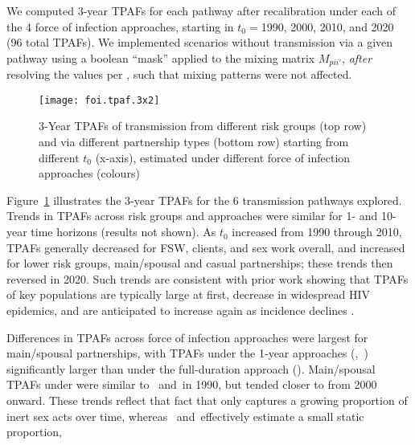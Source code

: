 We computed 3-year TPAFs for each pathway
after recalibration under each of the 4 force of infection approaches,
starting in $t_0 = {}$1990, 2000, 2010, and 2020 (96 total TPAFs).
We implemented scenarios without transmission via a given pathway
using a boolean ``mask'' applied to the mixing matrix $M_{pii'}$,
\emph{after} resolving the values per ,
such that mixing patterns were not affected.
\par
\begin{figure}
  \texttt{[image: foi.tpaf.3x2]}
  \caption{3-Year TPAFs of transmission
    from different risk groups (top row) and
    via different partnership types (bottom row)
    starting from different $t_0$ (x-axis),
    estimated under different force of infection approaches (colours)}
  \label{fig:foi.tpaf}
\end{figure}
Figure~\ref{fig:foi.tpaf} illustrates the 3-year TPAFs
for the 6 transmission pathways explored.
Trends in TPAFs across risk groups and approaches
were similar for 1- and 10-year time horizons (results not shown).
As $t_0$ increased from 1990 through 2010, TPAFs generally
decreased for FSW, clients, and sex work overall, and
increased for lower risk groups, main/spousal and casual partnerships;
these trends then reversed in 2020.
Such trends are consistent with prior work showing that
TPAFs of key populations are typically large at first,
decrease in widespread HIV epidemics, and
are anticipated to increase again as incidence declines
\cite{Johnson2011,Mishra2012sr,Boily2015,Brown2019,Garnett2021}.
\par
Differences in TPAFs across force of infection approaches were
largest for main/spousal partnerships, with TPAFs
under the 1-year approaches (\iry,~\ipy) significantly larger than
under the full-duration approach (\ird).
Main/spousal TPAFs under \epa were similar to \iry~and~\ipy in 1990,
but tended closer to \ird from 2000 onward.
These trends reflect that fact that only \epa captures
a growing proportion of inert sex acts over time,
whereas \iry~and~\ipy effectively estimate a small static proportion,
